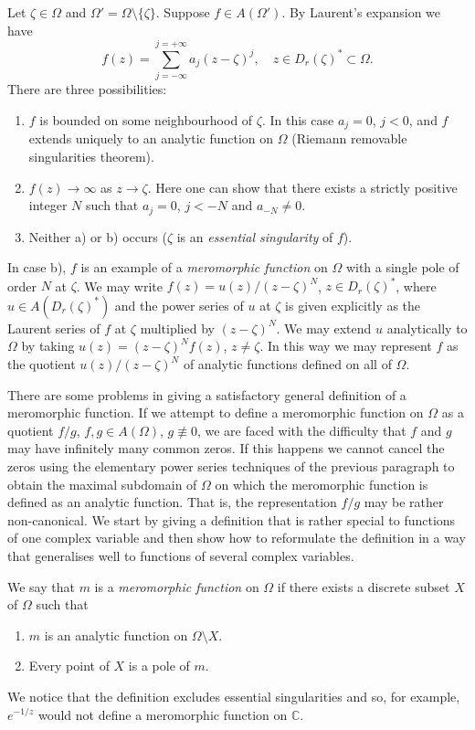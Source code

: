 Let $\zeta\in\Omega$ and $\Omega'=\Omega\setminus\{\zeta\}$. Suppose $f\in A(\Omega')$. By Laurent's expansion we have
\[ f(z)=\sum_{j=-\infty}^{j=+\infty}a_j(z-\zeta)^j,\quad z\in D_r(\zeta)^*\subset\Omega. \]
There are three possibilities:
\begin{enumerate}
\item[(a)] $f$ is bounded on some neighbourhood of $\zeta$. In this case $a_j=0$, $j<0$, and $f$ extends uniquely to an analytic function on $\Omega$ (Riemann removable singularities theorem).
\item[(b)] $f(z)\to\infty$ as $z\to\zeta$. Here one can show that there exists a strictly positive integer $N$ such that $a_j=0$, $j<-N$ and $a_{-N}\ne0$.
\item[(c)] Neither a) or b) occurs ($\zeta$ is an \emph{essential singularity} of $f$).
\end{enumerate}
In case b), $f$ is an example of a \emph{meromorphic function} on $\Omega$ with a single pole of order $N$ at $\zeta$. We may write $f(z)=u(z)/(z-\zeta)^N$, $z\in D_r(\zeta)^*$, where $u\in A(D_r(\zeta)^*)$ and the power series of $u$ at $\zeta$ is given explicitly as the Laurent series of $f$ at $\zeta$ multiplied by $(z-\zeta)^N$. We may extend $u$ analytically to $\Omega$ by taking $u(z)=(z-\zeta)^Nf(z)$, $z\ne\zeta$. In this way we may represent $f$ as the quotient $u(z)/(z-\zeta)^N$ of analytic functions defined on all of $\Omega$.

There are some problems in giving a satisfactory general definition of a meromorphic function. If we attempt to define a meromorphic function on $\Omega$ as a quotient $f/g$, $f,g\in A(\Omega)$, $g\not\equiv0$, we are
faced with the difficulty that $f$ and $g$ may have infinitely many common zeros. If this happens we cannot cancel the zeros using the elementary power series techniques of the previous paragraph to obtain the maximal subdomain of $\Omega$ on which the meromorphic function is defined as an analytic function. That is, the representation $f/g$ may be rather non-canonical. We start by giving a definition that is rather special to functions of one complex variable and then show how to reformulate the definition in a way that generalises well to functions of several complex variables.

 We say that $m$ is a \emph{meromorphic function} on $\Omega$ if there exists a discrete subset $X$ of $\Omega$ such that
\begin{enumerate}
\item[(i)] $m$ is an analytic function on $\Omega\setminus X$.
\item[(ii)] Every point of $X$ is a pole of $m$.
\end{enumerate}
We notice that the definition excludes essential singularities and so, for example, $e^{-1/z}$ would not define a meromorphic function on $\mathbb C$.

